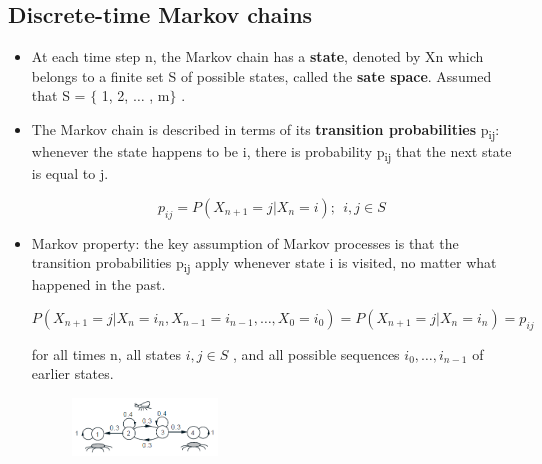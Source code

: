 \documentclass[12pt]{report}
\renewcommand{\_}{\kern-1.5pt\textunderscore\kern-1.5pt}
\begin{document}
\subsection*{Discrete-time Markov chains}
\begin{itemize}
	\item At each time step n, the Markov chain has a \textbf{state}, denoted by Xn which belongs to a finite set S of possible states, called the \textbf{sate space}. Assumed that S = $ \{ $ 1, 2, $ \ldots $ , m$ \} $ .\par

	\item The Markov chain is described in terms of its \textbf{transition probabilities} p\textsubscript{ij}: whenever the state happens to be i, there is probability p\textsubscript{ij} that the next state is equal to j.\par

 \[ p_{ij}=P \left( X_{n+1}=j \vert X_{n}=i \right) ;~~ i,j \in S \] \par

	\item Markov property: the key assumption of Markov processes is that the transition probabilities p\textsubscript{ij} apply whenever state i is visited, no matter what happened in the past. \par

 \[ P \left( X_{n+1}=j \vert X_{n}=i_{n},X_{n-1}=i_{n-1}, \ldots ,X_{0}=i_{0} \right) =P \left( X_{n+1}=j \vert X_{n}=i_{n} \right) =p_{ij} \] \par

for all times n, all states  \( i,j \in S \) , and all possible sequences  \( i_{0}, \ldots ,i_{n-1} \)  of earlier states. \par




\begin{figure}[H]
\advance\leftskip 5.64in		\includegraphics[width=1.53in,height=0.6in]{./media/image1.png}
\end{figure}




\end{itemize}
\end{document}
